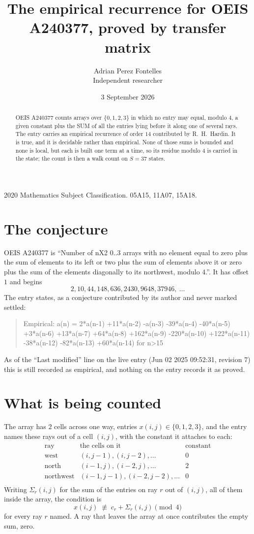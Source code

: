 \documentclass[11pt,a4paper]{article}
\title{The empirical recurrence for OEIS A240377, proved by transfer matrix}
\author{Adrian Perez Fontelles\\ \small Independent researcher}
\date{3 September 2026}
\theoremstyle{plain}
\theoremstyle{definition}
\begin{document}
\maketitle

\begin{abstract}
OEIS A240377 counts arrays over $\{0,1,2,3\}$ in which no entry may equal, modulo $4$, a given
constant plus the SUM of all the entries lying before it along one of several rays. The entry
carries an empirical recurrence of order $14$ contributed by R.~H.~Hardin. It is true, and
it is decidable rather than empirical. None of those sums is bounded and none is local, but
each is built one term at a time, so its residue modulo $4$ is carried in the state; the
count is then a walk count on $S=37$ states.
\end{abstract}

\noindent\small 2020 Mathematics Subject Classification. 05A15, 11A07, 15A18.\normalsize

\section{The conjecture}

OEIS A240377 is ``Number of nX2 0..3 arrays with no element equal to zero plus the sum of elements to its left or two plus the sum of elements above it or zero plus the sum of the elements diagonally to its northwest, modulo 4.''. It has offset $1$ and begins
\[
2, 10, 44, 148, 636, 2430, 9648, 37946,\ \dots
\]
The entry states, as a conjecture contributed by its author and never marked settled:
\begin{quote}
Empirical: a(n) = 2*a(n-1) +11*a(n-2) -a(n-3) -39*a(n-4) -40*a(n-5) +3*a(n-6) +13*a(n-7) +64*a(n-8) +162*a(n-9) -220*a(n-10) +122*a(n-11) -38*a(n-12) -82*a(n-13) +60*a(n-14) for n>15
\end{quote}
As of the ``Last modified'' line on the live entry (Jun 02 2025 09:52:31, revision 7) this is still
recorded as empirical, and nothing on the entry records it as proved.

\section{What is being counted}

The array has $2$ cells across one way, entries $x(i,j)\in\{0,1,2,3\}$, and the entry names these
rays out of a cell $(i,j)$, with the constant it attaches to each:
\[
\begin{array}{lll}
\text{ray} & \text{the cells on it} & \text{constant} \\[2pt]
\text{west} & (i,j-1),(i,j-2),\dots & 0 \\
\text{north} & (i-1,j),(i-2,j),\dots & 2 \\
\text{northwest} & (i-1,j-1),(i-2,j-2),\dots & 0 \\
\end{array}
\]
Writing $\Sigma_r(i,j)$ for the sum of the entries on ray $r$ out of $(i,j)$, all of them
inside the array, the condition is
\[
x(i,j)\;\not\equiv\;c_r+\Sigma_r(i,j) \pmod{4}
\]
for every ray $r$ named. A ray that leaves the array at once contributes the empty sum,
zero.
\end{document}
